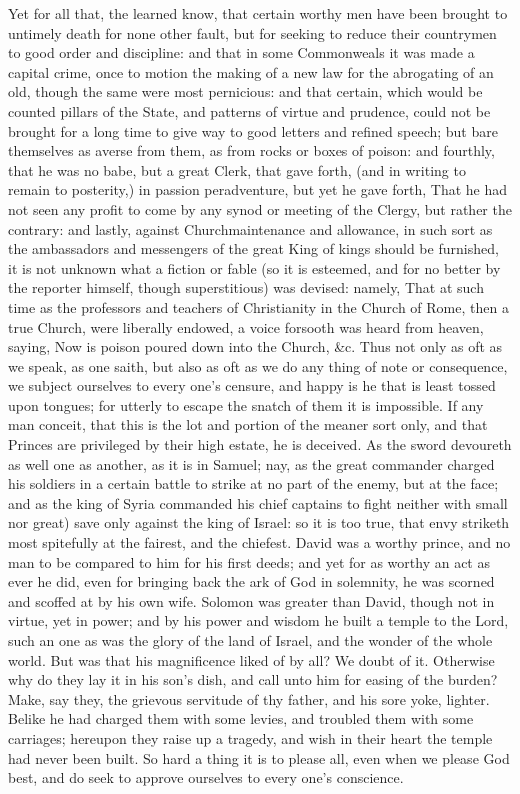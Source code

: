 Yet for all that, the learned know, that certain worthy men have been brought to untimely death for none other fault, but for seeking to reduce their countrymen to good order and discipline: and that in some Commonweals it was made a capital crime, once to motion the making of a new law for the abrogating of an old, though the same were most pernicious: and that certain, which would be counted pillars of the State, and patterns of virtue and prudence, could not be brought for a long time to give way to good letters and refined speech; but bare themselves as averse from them, as from rocks or boxes of poison: and fourthly, that he was no babe, but a great Clerk, that gave forth, (and in writing to remain to posterity,) in passion peradventure, but yet he gave forth, That he had not seen any profit to come by any synod or meeting of the Clergy, but rather the contrary: and lastly, against Churchmaintenance and allowance, in such sort as the ambassadors and messengers of the great King of kings should be furnished, it is not unknown what a fiction or fable (so it is esteemed, and for no better by the reporter himself, though superstitious) was devised: namely, That at such time as the professors and teachers of Christianity in the Church of Rome, then a true Church, were liberally endowed, a voice forsooth was heard from heaven, saying, Now is poison poured down into the Church, &c. Thus not only as oft as we speak, as one saith, but also as oft as we do any thing of note or consequence, we subject ourselves to every one's censure, and happy is he that is least tossed upon tongues; for utterly to escape the snatch of them it is impossible. If any man conceit, that this is the lot and portion of the meaner sort only, and that Princes are privileged by their high estate, he is deceived. As the sword devoureth as well one as another, as it is in Samuel; nay, as the great commander charged his soldiers in a certain battle to strike at no part of the enemy, but at the face; and as the king of Syria commanded his chief captains to fight neither with small nor great) save only against the king of Israel: so it is too true, that envy striketh most spitefully at the fairest, and the chiefest. David was a worthy prince, and no man to be compared to him for his first deeds; and yet for as worthy an act as ever he did, even for bringing back the ark of God in solemnity, he was scorned and scoffed at by his own wife. Solomon was greater than David, though not in virtue, yet in power; and by his power and wisdom he built a temple to the Lord, such an one as was the glory of the land of Israel, and the wonder of the whole world. But was that his magnificence liked of by all? We doubt of it. Otherwise why do they lay it in his son's dish, and call unto him for easing of the burden? Make, say they, the grievous servitude of thy father, and his sore yoke, lighter. Belike he had charged them with some levies, and troubled them with some carriages; hereupon they raise up a tragedy, and wish in their heart the temple had never been built. So hard a thing it is to please all, even when we please God best, and do seek to approve ourselves to every one's conscience.

